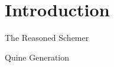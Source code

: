 \section{Introduction}

The Reasoned Schemer~\cite{fair:TheReasonedSchemer}

Quine Generation~\cite{fair:quines}